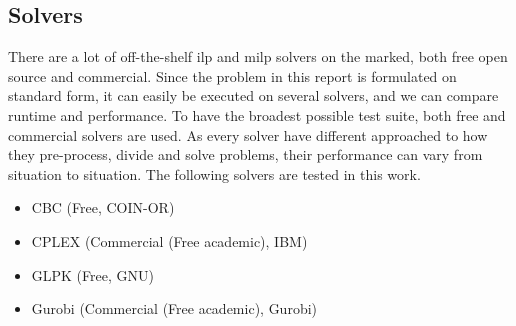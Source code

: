 \subsection{Solvers}
There are a lot of off-the-shelf \gls{ilp} and \gls{milp} solvers on the marked, both free open source and commercial. Since the problem in this report is formulated on standard form, it can easily be executed on several solvers, and we can compare runtime and performance. To have the broadest possible test suite, both free and commercial solvers are used. As every solver have different approached to how they pre-process, divide and solve problems, their performance can vary from situation to situation. The following solvers are tested in this work.
\begin{itemize}
\item CBC 		(Free, COIN-OR)
\item CPLEX 	(Commercial (Free academic),  IBM)
\item GLPK 		(Free, GNU)
\item Gurobi 	(Commercial (Free academic), Gurobi)
\end{itemize}